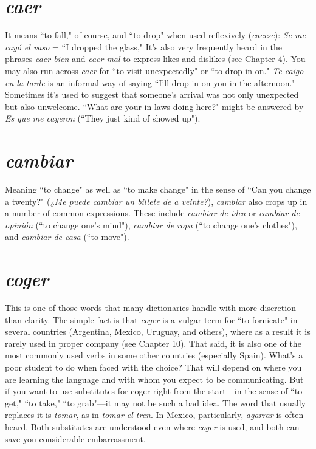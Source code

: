 \section{\emph{caer}}

It means ``to fall," of course, and ``to drop" when used reflexively (\emph{caerse}): \emph{Se me cayó el vaso} = ``I dropped the glass," It's also
very frequently heard in the phrases \emph{caer bien} and \emph{caer mal} to express
likes and dislikes (see Chapter 4). You may also run across \emph{caer} for ``to
visit unexpectedly" or ``to drop in on." \emph{Te caigo en la tarde} is an informal way of saying ``I'll drop in on you in the afternoon." Sometimes
it's used to suggest that someone's arrival was not only unexpected but
also unwelcome. ``What are your in-laws doing here?" might be answered by \emph{Es que me cayeron} (``They just kind of showed up").

\section{\emph{cambiar}}

Meaning ``to change" as well as ``to make change" in the sense
of ``Can you change a twenty?" (\emph{¿Me puede cambiar un billete de a
	veinte?}), \emph{cambiar} also crops up in a number of common expressions.
These include \emph{cambiar de idea} or \emph{cambiar de opinión} (``to change
one's mind"), \emph{cambiar de ropa} (``to change one's clothes"), and \emph{cambiar de casa} (``to move").

\section{\emph{coger}}

This is one of those words that many dictionaries handle with
more discretion than clarity. The simple fact is that \emph{coger} is a vulgar
term for ``to fornicate" in several countries (Argentina, Mexico, Uruguay, and others), where as a result it is rarely used in proper company
(see Chapter 10). That said, it is also one of the most commonly used
verbs in some other countries (especially Spain). What's a poor student
to do when faced with the choice? That will depend on where you are
learning the language and with whom you expect to be communicating. But if you want to use substitutes for coger right from the start---in the sense of ``to get," ``to take," ``to grab"---it may not be such a bad
idea. The word that usually replaces it is \emph{tomar}, as in \emph{tomar el tren}. In
Mexico, particularly, \emph{agarrar} is often heard. Both substitutes are
understood even where \emph{coger} is used, and both can save you considerable
embarrassment.

